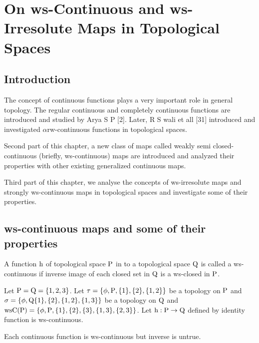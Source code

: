 \chapter{On ws-Continuous and ws-Irresolute Maps in Topological Spaces}
\graphicspath{{Chapter3/Chapter3Figs/EPS/}{Chapter3/Chapter3Figs/}}

\section{Introduction}\label{sec3.1}

The concept of continuous functions plays a very important role in general topology. The regular continuous and completely continuous functions are introduced and studied by Arya S P [2]. Later, R S wali et all [31] introduced and investigated $\alpha$rw-continuous functions in topological spaces.

Second part of this chapter, a new class of maps called weakly semi closed-continuous (briefly, ws-continuous) maps are introduced and analyzed their properties with other existing generalized continuous maps.

Third part of this chapter, we analyse the concepts of ws-irresolute maps and strongly ws-continuous maps in topological spaces and investigate some of their properties.

\section{ws-continuous maps and some of their properties}\label{sec3.2}

\begin{dfn}\label{defi3.2.1}
A function $\mathrm{h}$ of topological space $\mathrm{P}$ in to a topological space $\mathrm{Q}$ is called a ws-continuous if inverse image of each closed set in $\mathrm{Q}$ is a ws-closed in $\mathrm{P}$.
\end{dfn}

\begin{exm}\label{exam3.2.2}
Let $\mathrm{P}=\mathrm{Q}= \{1, 2, 3\}$. Let $\tau = \{\phi, \mathrm{P}, \{1\}, \{2\}, \{1, 2\}\}$ be a topology on $\mathrm{P}$ and $\sigma = \{\phi, \mathrm{Q} \{1\}, \{2\}, \{1, 2\}, \{1, 3\}\}$ be a topology on $\mathrm{Q}$ and $\mathrm{ws}\mathrm{C}(\mathrm{P}) = \{\phi, \mathrm{P}, \{1\}, \{2\},\{3\}, \{1, 3\},\{2, 3\}\}$. Let $\mathrm{h}: \mathrm{P}\to \mathrm{Q}$ defined by identity function is ws-continuous.
\end{exm}

\begin{thm}\label{thm3.2.3}
Each continuous function is ws-continuous but inverse is untrue.
\end{thm}

